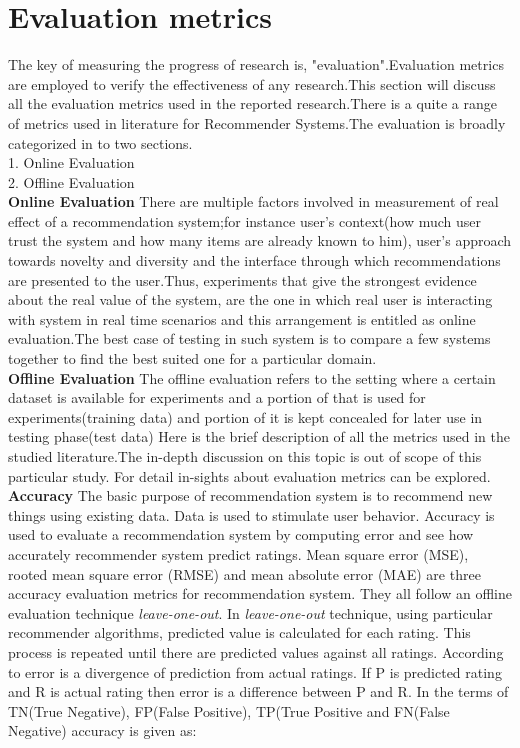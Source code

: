 \section{Evaluation metrics}
The key of measuring the progress of research is, "evaluation".Evaluation metrics are employed to verify the effectiveness of any research.This section will discuss all the evaluation metrics used in the reported research.There is a quite a range of metrics used in literature for Recommender Systems.The evaluation is broadly categorized in to two sections.\cite{AddRef}
\\1. Online Evaluation
\\2. Offline Evaluation 
\newline
\\\textbf{Online Evaluation}
There are multiple factors involved in measurement of real effect of a recommendation system;for instance user's context(how much user trust the system and how many items are already known to him), user's approach towards novelty and diversity and the interface through which recommendations are presented to the user.Thus, experiments that give the strongest evidence about the real value of the system, are the one in which real user is interacting with system in real time scenarios and this arrangement is entitled as online evaluation.The best case of testing in such system is to compare a few systems together to find the best suited one for a particular domain.\cite{online-evaluation}
\newline
\\\textbf{Offline Evaluation}
The offline evaluation refers to the setting where a certain dataset is available for experiments and a portion of that is used for experiments(training data) and portion of it is kept concealed for later use in testing phase(test data)
\newline
Here is the brief description of all the metrics used in the studied literature.The in-depth discussion on this topic is out of scope of this particular study. For detail in-sights about evaluation metrics \cite{online-evaluation} can be explored.
\newline
\textbf{Accuracy}
The basic purpose of recommendation system is to recommend new things using existing data. Data is used to stimulate user behavior. Accuracy is used to evaluate a recommendation system by computing error and see how accurately recommender system predict ratings.  Mean square error (MSE), rooted mean square error (RMSE) and mean absolute error (MAE) are three accuracy evaluation metrics for recommendation system. They all follow an offline evaluation technique \textit{leave-one-out}. In \textit{leave-one-out} technique, using particular recommender algorithms, predicted value is calculated for each rating. This process is repeated until there are predicted values against all ratings. According to \cite{Metrics1} error is a divergence of prediction from actual ratings. If P is predicted rating and R is actual rating then error is a difference between P and R. In the terms of TN(True Negative), FP(False Positive), TP(True Positive and FN(False Negative) accuracy is given as:
